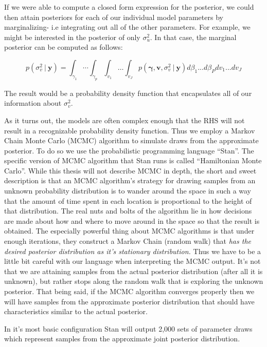 \documentclass[12pt,twoside]{reedthesis}
\begin{document}
If we were able to compute a closed form expression for the posterior, we could then attain posteriors for each of our individual model parameters by marginalizing- i.e integrating out all of the other parameters. For example, we might be interested in the posterior of only \(\sigma_u^2\). In that case, the marginal posterior can be computed as follows:

\[
p(\sigma_{v}^2 \ | \ \mathbf{y}) = \int_{\gamma_1} \cdots \int_{\gamma_p} \int_{v_1} \dots \int_{v_J} p(\boldsymbol{\gamma}, \mathbf{v},  \sigma_{v}^2 \ | \ \mathbf{y}) d\beta_1 ... d\beta_P dv_1 ... dv_J
\]

The result would be a probability density function that encapsulates all of our information about \(\sigma_{v}^2\).

As it turns out, the models are often complex enough that the RHS will not result in a recognizable probability density function. Thus we employ a Markov Chain Monte Carlo (MCMC) algorithm to simulate draws from the approximate posterior. To do so we use the probabilistic programming language ``Stan''. The specific version of MCMC algorithm that Stan runs is called ``Hamiltonian Monte Carlo''. While this thesis will not describe MCMC in depth, the short and sweet description is that an MCMC algorithm's strategy for drawing samples from an unknown probability distribution is to wander around the space in such a way that the amount of time spent in each location is proportional to the height of that distribution. The real nuts and bolts of the algorithm lie in how decisions are made about how and where to move around in the space so that the result is obtained. The especially powerful thing about MCMC algorithms is that under enough iterations, they construct a Markov Chain (random walk) that \emph{has the desired posterior distribution as it's stationary distribution.} Thus we have to be a little bit careful with our language when interpreting the MCMC output. It's not that we are attaining samples from the actual posterior distribution (after all it is unknown), but rather stops along the random walk that is exploring the unknown posterior. That being said, if the MCMC algorithm converges properly then we will have samples from the approximate posterior distribution that should have characteristics similar to the actual posterior.

In it's most basic configuration Stan will output 2,000 sets of parameter draws which represent samples from the approximate joint posterior distribution.
\end{document}
